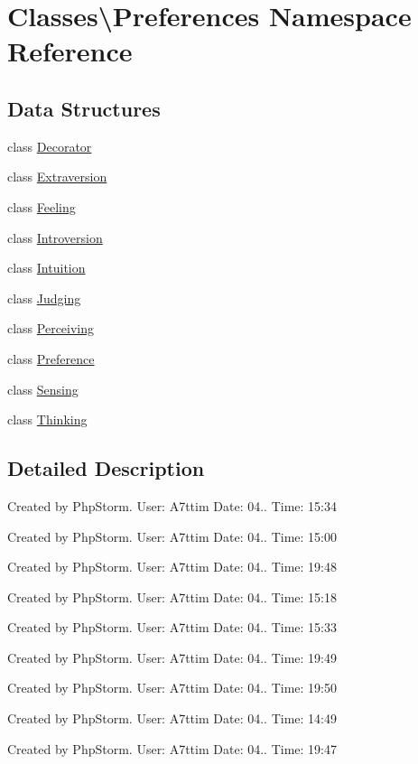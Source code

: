 \hypertarget{namespace_classes_1_1_preferences}{}\section{Classes\textbackslash{}Preferences Namespace Reference}
\label{namespace_classes_1_1_preferences}
\subsection*{Data Structures}
\begin{DoxyCompactItemize}
\item 
class \hyperlink{class_classes_1_1_preferences_1_1_decorator}{Decorator}
\item 
class \hyperlink{class_classes_1_1_preferences_1_1_extraversion}{Extraversion}
\item 
class \hyperlink{class_classes_1_1_preferences_1_1_feeling}{Feeling}
\item 
class \hyperlink{class_classes_1_1_preferences_1_1_introversion}{Introversion}
\item 
class \hyperlink{class_classes_1_1_preferences_1_1_intuition}{Intuition}
\item 
class \hyperlink{class_classes_1_1_preferences_1_1_judging}{Judging}
\item 
class \hyperlink{class_classes_1_1_preferences_1_1_perceiving}{Perceiving}
\item 
class \hyperlink{class_classes_1_1_preferences_1_1_preference}{Preference}
\item 
class \hyperlink{class_classes_1_1_preferences_1_1_sensing}{Sensing}
\item 
class \hyperlink{class_classes_1_1_preferences_1_1_thinking}{Thinking}
\end{DoxyCompactItemize}


\subsection{Detailed Description}
Created by Php\+Storm. User\+: A7ttim Date\+: 04.. Time\+: 15\+:34

Created by Php\+Storm. User\+: A7ttim Date\+: 04.. Time\+: 15\+:00

Created by Php\+Storm. User\+: A7ttim Date\+: 04.. Time\+: 19\+:48

Created by Php\+Storm. User\+: A7ttim Date\+: 04.. Time\+: 15\+:18

Created by Php\+Storm. User\+: A7ttim Date\+: 04.. Time\+: 15\+:33

Created by Php\+Storm. User\+: A7ttim Date\+: 04.. Time\+: 19\+:49

Created by Php\+Storm. User\+: A7ttim Date\+: 04.. Time\+: 19\+:50

Created by Php\+Storm. User\+: A7ttim Date\+: 04.. Time\+: 14\+:49

Created by Php\+Storm. User\+: A7ttim Date\+: 04.. Time\+: 19\+:47 